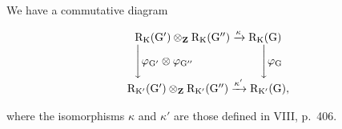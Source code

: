 We have a commutative diagram

\[
\begin{array}{c} \mathrm{R} _ {\mathrm{K}} (\mathrm{G} ^ {\prime}) \otimes_ {\mathbf {Z}} \mathrm{R} _ {\mathrm{K}} (\mathrm{G} ^ {\prime \prime}) \xrightarrow {\kappa} \mathrm{R} _ {\mathrm{K}} (\mathrm{G}) \\ \Biggl \downarrow \varphi_ {\mathrm{G} ^ {\prime}} \otimes \varphi_ {\mathrm{G} ^ {\prime \prime}} \qquad \qquad \qquad \Biggl \downarrow \varphi_ {\mathrm{G}} \\ \mathrm{R} _ {\mathrm{K} ^ {\prime}} (\mathrm{G} ^ {\prime}) \otimes_ {\mathbf {Z}} \mathrm{R} _ {\mathrm{K} ^ {\prime}} (\mathrm{G} ^ {\prime \prime}) \xrightarrow {\kappa^ {\prime}} \mathrm{R} _ {\mathrm{K} ^ {\prime}} (\mathrm{G})  , \end{array}
\]

where the isomorphisms \(\kappa\) and \(\kappa'\) are those defined in VIII, p.~406.

